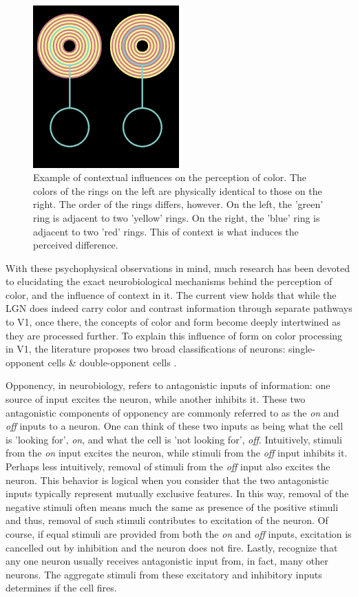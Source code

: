 \documentclass[journal,onecolumn]{IEEEtran}
\begin{document}
\begin{figure}[ht]
    \center
    \includegraphics[width=0.5\textwidth]{test-circle-a-reference}
    \caption{Example of contextual influences on the perception of color. The colors of the rings on the left are physically identical to those on the right. The order of the rings differs, however. On the left, the 'green' ring is adjacent to two 'yellow' rings. On the right, the 'blue' ring is adjacent to two 'red' rings. This of context is what induces the perceived difference.}
    \label{fig:example}
\end{figure}

With these psychophysical observations in mind, much research has been devoted to elucidating the exact neurobiological mechanisms behind the perception of color, and the influence of context in it. The current view holds that while the LGN does indeed carry color and contrast information through separate pathways to V1, once there, the concepts of color and form become deeply intertwined as they are processed further. To explain this influence of form on color processing in V1, the literature proposes two broad classifications of neurons: single-opponent cells \& double-opponent cells \cite{johnson:2008}.

Opponency, in neurobiology, refers to antagonistic inputs of information: one source of input excites the neuron, while another inhibits it. These two antagonistic components of opponency are commonly referred to as the \textit{on} and \textit{off} inputs to a neuron. One can think of these two inputs as being what the cell is 'looking for', \textit{on}, and what the cell is 'not looking for', \textit{off}. Intuitively, stimuli from the \textit{on} input excites the neuron, while stimuli from the \textit{off} input inhibits it. Perhaps less intuitively, removal of stimuli from the \textit{off} input also excites the neuron. This behavior is logical when you consider that the two antagonistic inputs typically represent mutually exclusive features. In this way, removal of the negative stimuli often means much the same as presence of the positive stimuli and thus, removal of such stimuli contributes to excitation of the neuron. Of course, if equal stimuli are provided from both the \textit{on} and \textit{off} inputs, excitation is cancelled out by inhibition and the neuron does not fire. Lastly, recognize that any one neuron usually receives antagonistic input from, in fact, many other neurons. The aggregate stimuli from these excitatory and inhibitory inputs determines if the cell fires.
\end{document}
